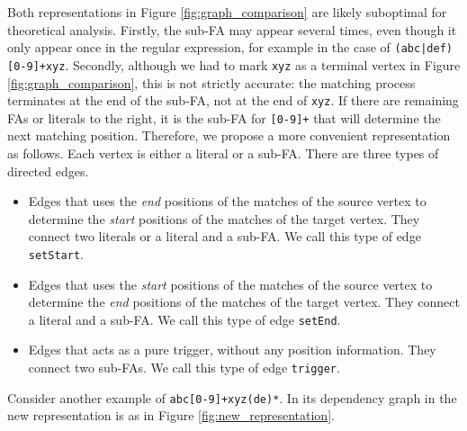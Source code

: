 Both representations in Figure \ref{fig:graph_comparison} are likely suboptimal for theoretical analysis. Firstly, the sub-FA may appear several times, even though it only appear once in the regular expression, for example in the case of \texttt{(abc|def)[0-9]+xyz}. Secondly, although we had to mark \texttt{xyz} as a terminal vertex in Figure \ref{fig:graph_comparison}, this is not strictly accurate: the matching process terminates at the end of the sub-FA, not at the end of \texttt{xyz}. If there are remaining FAs or literals to the right, it is the sub-FA for \texttt{[0-9]+} that will determine the next matching position. Therefore, we propose a more convenient representation as follows. Each vertex is either a literal or a sub-FA. There are three types of directed edges.
\begin{itemize}
  \item Edges that uses the \textit{end} positions of the matches of the source vertex to determine the \textit{start} positions of the matches of the target vertex. They connect two literals or a literal and a sub-FA. We call this type of edge \texttt{setStart}.
  \item Edges that uses the \textit{start} positions of the matches of the source vertex to determine the \textit{end} positions of the matches of the target vertex. They connect a literal and a sub-FA. We call this type of edge \texttt{setEnd}.
  \item Edges that acts as a pure trigger, without any position information. They connect two sub-FAs. We call this type of edge \texttt{trigger}.
\end{itemize}

Consider another example of \texttt{abc[0-9]+xyz(de)*}. In its dependency graph in the new representation is as in Figure \ref{fig:new_representation}.

